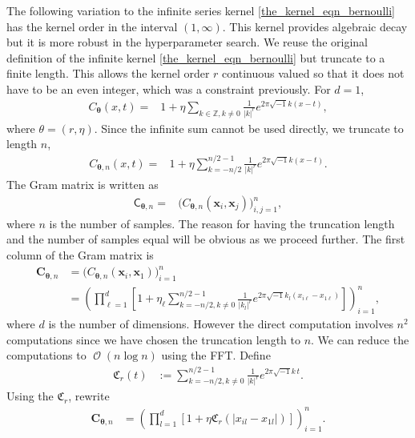\documentclass{iitthesis}          %
\DeclareMathOperator{\Order}{{\mathcal O}}
\newcommand{\bm}[1]{\boldsymbol{#1}}
\newcommand{\vtheta}{{\bm{\theta}}}
\newcommand{\vC}{\bm{C}}
\newcommand{\vx}{\bm{x}}
\newcommand{\mC}{\mathsf{C}}
\def\abs#1{\ensuremath{\left \lvert #1 \right \rvert}}
\begin{document}
\label{sec:trunc_series_kernel}
The following variation to the infinite series kernel \eqref{the_kernel_eqn_bernoulli} has the kernel order in the interval $(1, \infty)$. This kernel provides algebraic decay but it is more robust in the hyperparameter search.
We reuse the original definition of the infinite kernel \eqref{the_kernel_eqn_bernoulli} but truncate to a finite length. This allows the kernel order $r$ continuous valued so that it does not have to be an even integer,  which was a constraint previously. 
For $d=1$,
\begin{align*}
C_\vtheta(x, t) = & 1 + \eta \sum_{k \in \mathbb{Z}, k \neq 0 } \frac{1}{\abs{k}^r} 
e^{ 2 \pi\sqrt{-1} k (x-t)},
\end{align*}
where $\theta = (r, \eta)$. 
Since the infinite sum cannot be used directly, we truncate to length $n$,
\begin{align*}
C_{\vtheta, n}(x, t) = & 1 + \eta \sum_{k = - n/2 }^{n/2 - 1} \frac{1}{\abs{k}^r} 
e^{ 2 \pi\sqrt{-1} k (x-t)}.
\end{align*}
The Gram matrix is written as 
\begin{align*}
\mC_{\vtheta, n} = & \biggl( C_{\vtheta, n}(\vx_i, \vx_j) \biggr)_{i,j=1}^n,
\end{align*}
where $n$ is the number of samples. 
The reason for having the truncation length and the number of samples equal will be obvious as we proceed further.
The first column of the Gram matrix is
\begin{align*}
\vC_{\vtheta, n} &= \biggl( C_{\vtheta, n}(\vx_i, \vx_1) \biggr)_{i=1}^n
\\
&= \left( \prod_{\ell=1}^d \left[ 1 + \eta_\ell \sum_{k = - n/2, k \neq 0 }^{n/2 - 1} \frac{1}{\abs{k_l}^r} 
e^{ 2 \pi\sqrt{-1} k_l (x_{i\ell}-x_{1\ell})}\right] \right)_{i=1}^n, 
\end{align*}
where $d$ is the number of dimensions. 
However the direct computation involves $n^2$ computations since we have chosen the truncation length to $n$. We can reduce the computations to $\Order(n\log n)$ using the FFT.
Define
\begin{align*}
\mathfrak{C}_r(t) &:= \sum_{k = - n/2, k \neq 0 }^{n/2 -1} \frac{1}{\abs{k}^r} 
e^{ 2 \pi\sqrt{-1} k\, t}.
\end{align*}
Using the $\mathfrak{C}_r$, rewrite
\begin{align}
\label{eqn:trunc_series_kernel}
\vC_{\vtheta, n}
&= \left( \prod_{l=1}^d \left[ 1 + \eta \mathfrak{C}_r( \abs{x_{il} - x_{1l}})\right] \right)_{i=1}^n.
\end{align}
\end{document}
